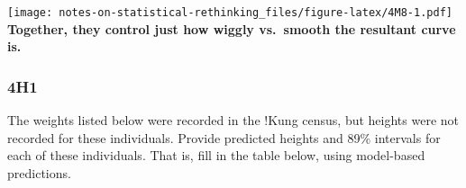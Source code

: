 \documentclass[
]{book}
\newenvironment{Shaded}{\begin{snugshade}}{\end{snugshade}}
\newcommand{\AttributeTok}[1]{\textcolor[rgb]{0.77,0.63,0.00}{#1}}
\newcommand{\DecValTok}[1]{\textcolor[rgb]{0.00,0.00,0.81}{#1}}
\newcommand{\FloatTok}[1]{\textcolor[rgb]{0.00,0.00,0.81}{#1}}
\newcommand{\FunctionTok}[1]{\textcolor[rgb]{0.00,0.00,0.00}{#1}}
\newcommand{\NormalTok}[1]{#1}
\newcommand{\OtherTok}[1]{\textcolor[rgb]{0.56,0.35,0.01}{#1}}
\newcommand{\SpecialCharTok}[1]{\textcolor[rgb]{0.00,0.00,0.00}{#1}}
\newcommand{\StringTok}[1]{\textcolor[rgb]{0.31,0.60,0.02}{#1}}
\begin{document}
\begin{Shaded}
\end{Shaded}

\texttt{[image: notes-on-statistical-rethinking\_files/figure-latex/4M8-1.pdf]}
\textbf{Together, they control just how wiggly vs.~smooth the resultant curve is.}

\hypertarget{h1-2}{%
\subsubsection*{4H1}\label{h1-2}}

The weights listed below were recorded in the !Kung census, but heights were not recorded for these individuals. Provide predicted heights and 89\% intervals for each of these individuals. That is, fill in the table below, using model-based predictions.
\end{document}
